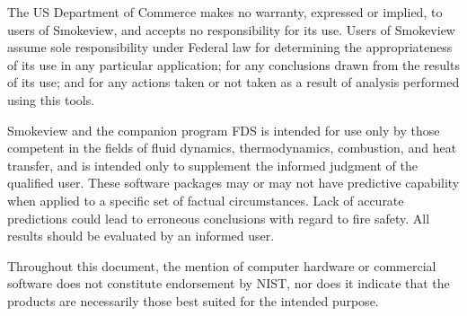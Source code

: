 \documentclass[11pt,twoside]{book}
\begin{document}
The US Department of Commerce makes no warranty,
expressed or implied, to users of Smokeview, and accepts no
responsibility for its use. Users of Smokeview assume sole
responsibility under Federal law for determining the
appropriateness of its use in any particular application; for any
conclusions drawn from the results of its use; and for any actions
taken or not taken as a result of analysis performed using this
tools.

Smokeview and the companion program FDS is intended for use only
by those competent in the fields of fluid dynamics,
thermodynamics, combustion, and heat transfer, and is intended
only to supplement the informed judgment of the qualified user.
These software packages may or may not have predictive capability
when applied to a specific set of factual circumstances. Lack of
accurate predictions could lead to erroneous conclusions with
regard to fire safety. All results should be evaluated by an
informed user.

Throughout this document, the mention of computer hardware or
commercial software does not constitute endorsement by NIST,
nor does
it indicate that the products are necessarily those
best suited for the
intended purpose.

\tableofcontents
\listoffigures

\mainmatter


%
%
%

\end{document}
